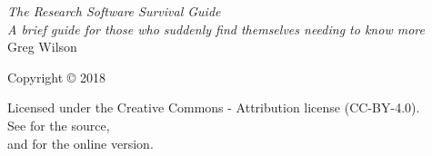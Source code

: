 \pagestyle{empty}

{\begingroup
  \raggedleft
  \vspace*{\baselineskip}


  {\Huge\itshape The Research Software Survival Guide}\\[\baselineskip]

  {\large\itshape
    A brief guide for those who suddenly find themselves needing to know more
  }\\[0.2\textheight]

  {\large Greg Wilson}\par

  \vfill

  {\large Copyright {\copyright} 2018}

  \vspace*{\baselineskip}

  {\small
    Licensed under the Creative Commons - Attribution license (CC-BY-4.0).
    \\
    See {\repository} for the source,\\
    and {\website} for the online version.
  }

\endgroup}

\newpage

\pagestyle{empty}

~

\newpage

\tableofcontents

\newpage

\pagestyle{empty}

~

\newpage

\pagestyle{plain}
